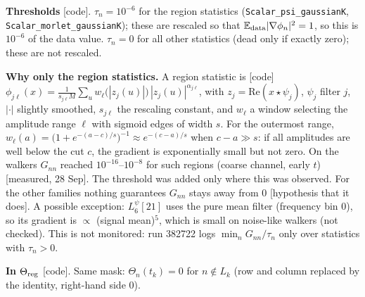 \documentclass[11pt,a4paper]{article}
\newcommand{\E}{\mathbb{E}}
\begin{document}
\textbf{Thresholds} [code]. $\tau_n=10^{-6}$ for the region statistics (\texttt{Scalar\_psi\_gaussianK},
\texttt{Scalar\_morlet\_gaussianK}); these are rescaled so that $\E_{\rm data}|\nabla\phi_n|^2=1$, so this is
$10^{-6}$ of the data value. $\tau_n=0$ for all other statistics (dead only if exactly zero); these are
not rescaled.

\textbf{Why only the region statistics.} A region statistic is [code]
$\phi_{j\ell}(x)=\frac1{s_{j\ell}M}\sum_u w_\ell\big(|z_j(u)|\big)\,|z_j(u)|^{\alpha_{j\ell}}$, with $z_j=\mathrm{Re}(x\star\psi_j)$, $\psi_j$ filter $j$,
$|\cdot|$ slightly smoothed, $s_{j\ell}$ the rescaling constant, and $w_\ell$ a window selecting the
amplitude range $\ell$ with sigmoid edges of width $s$. For the outermost range,
$w_\ell(a)=\big(1+e^{-(a-c)/s}\big)^{-1}\approx e^{-(c-a)/s}$ when $c-a\gg s$: if all amplitudes are well below
the cut $c$, the gradient is exponentially small but not zero. On the walkers $G_{nn}$ reached
$10^{-16}$--$10^{-8}$ for such regions (coarse channel, early $t$) [measured, 28 Sep]. The threshold
was added only where this was observed. For the other families nothing guarantees $G_{nn}$
stays away from 0 [hypothesis that it does]. A possible exception: $L_6^\psi[21]$ uses the pure
mean filter (frequency bin 0), so its gradient is $\propto$ (signal mean)$^5$, which is small on
noise-like walkers (not checked). This is not monitored: run 382722 logs
$\min_nG_{nn}/\tau_n$ only over statistics with $\tau_n>0$.

\textbf{In $\Theta_{\rm reg}$} [code]. Same mask: $\Theta_n(t_k)=0$ for $n\notin L_k$ (row and column replaced by
the identity, right-hand side 0).
\end{document}
